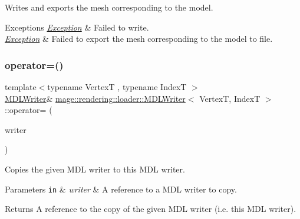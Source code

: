 Writes and exports the mesh corresponding to the model.


\begin{DoxyExceptions}{Exceptions}
{\em \hyperlink{classmage_1_1_exception}{Exception}} & Failed to write. \\
\hline
{\em \hyperlink{classmage_1_1_exception}{Exception}} & Failed to export the mesh corresponding to the model to file. \\
\hline
\end{DoxyExceptions}
\hypertarget{classmage_1_1rendering_1_1loader_1_1_m_d_l_writer_a9e5f38a8b5016534385039d44d3d71dc}{}\label{classmage_1_1rendering_1_1loader_1_1_m_d_l_writer_a9e5f38a8b5016534385039d44d3d71dc} 
\subsubsection{\texorpdfstring{operator=()}{operator=()}\hspace{0.1cm}{\footnotesize\ttfamily [1/2]}}
{\footnotesize\ttfamily template$<$typename VertexT , typename IndexT $>$ \\
\hyperlink{classmage_1_1rendering_1_1loader_1_1_m_d_l_writer}{M\+D\+L\+Writer}\& \hyperlink{classmage_1_1rendering_1_1loader_1_1_m_d_l_writer}{mage\+::rendering\+::loader\+::\+M\+D\+L\+Writer}$<$ VertexT, IndexT $>$\+::operator= (\begin{DoxyParamCaption}\item[{const \hyperlink{classmage_1_1rendering_1_1loader_1_1_m_d_l_writer}{M\+D\+L\+Writer}$<$ VertexT, IndexT $>$ \&}]{writer }\end{DoxyParamCaption})\hspace{0.3cm}{\ttfamily [delete]}}

Copies the given M\+DL writer to this M\+DL writer.


\begin{DoxyParams}[1]{Parameters}
\mbox{\tt in}  & {\em writer} & A reference to a M\+DL writer to copy. \\
\hline
\end{DoxyParams}
\begin{DoxyReturn}{Returns}
A reference to the copy of the given M\+DL writer (i.\+e. this M\+DL writer). 
\end{DoxyReturn}
\hypertarget{classmage_1_1rendering_1_1loader_1_1_m_d_l_writer_aaa2a3f4e8025bffefefaae7d3ef018f0}{}\label{classmage_1_1rendering_1_1loader_1_1_m_d_l_writer_aaa2a3f4e8025bffefefaae7d3ef018f0} 
